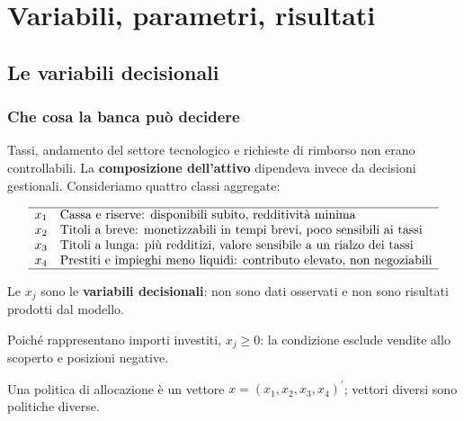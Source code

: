 

\section{Variabili, parametri, risultati}

\subsection{Le variabili decisionali}%

\begin{frame}%
%

\frametitle{Che cosa la banca pu\`{o} decidere}%
%

%


Tassi, andamento del settore tecnologico e richieste di rimborso non erano
controllabili. La \textbf{composizione dell'attivo} dipendeva invece da
decisioni gestionali. Consideriamo quattro classi aggregate:

\medskip

{\small
\[%
\begin{array}
[c]{ll}\hline
x_{1} & \mbox{Cassa e riserve: disponibili subito, redditivit\`{a} minima}\\
x_{2} &
\mbox{Titoli a breve: monetizzabili in tempi brevi, poco sensibili ai
tassi}\\
x_{3} &
\mbox{Titoli a lunga: pi\`{u} redditizi, valore sensibile a un rialzo
dei tassi}\\
x_{4} & \mbox{Prestiti e impieghi meno liquidi: contributo elevato, non
negoziabili}\\\hline
\end{array}
\]
}

\medskip

\begin{stepitemize}
\item Le $x_{j}$ sono le \textbf{variabili decisionali}: non sono dati
osservati e non sono risultati prodotti dal modello.

\item Poich\'{e} rappresentano importi investiti, $x_{j}\geq0$: la condizione
esclude vendite allo scoperto e posizioni negative.

\item Una politica di allocazione \`{e} un vettore $x=(x_{1},x_{2},x_{3}%
,x_{4})^{\prime}$; vettori diversi sono politiche diverse.
\end{stepitemize}

%

\transboxout
\end{frame}%


